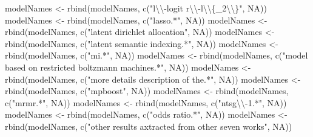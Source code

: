 \documentclass[
]{article}
\newenvironment{Shaded}{\begin{snugshade}}{\end{snugshade}}
\newcommand{\ConstantTok}[1]{\textcolor[rgb]{0.00,0.00,0.00}{#1}}
\newcommand{\FunctionTok}[1]{\textcolor[rgb]{0.00,0.00,0.00}{#1}}
\newcommand{\NormalTok}[1]{#1}
\newcommand{\OtherTok}[1]{\textcolor[rgb]{0.56,0.35,0.01}{#1}}
\newcommand{\SpecialCharTok}[1]{\textcolor[rgb]{0.00,0.00,0.00}{#1}}
\newcommand{\StringTok}[1]{\textcolor[rgb]{0.31,0.60,0.02}{#1}}
\begin{document}
\begin{Shaded}
\begin{Highlighting}[]
\NormalTok{modelNames }\OtherTok{\textless{}{-}} \FunctionTok{rbind}\NormalTok{(modelNames, }\FunctionTok{c}\NormalTok{(}\StringTok{"l}\SpecialCharTok{\textbackslash{}\textbackslash{}}\StringTok{{-}logit r}\SpecialCharTok{\textbackslash{}\textbackslash{}}\StringTok{{-}l}\SpecialCharTok{\textbackslash{}\textbackslash{}}\StringTok{\{\_2}\SpecialCharTok{\textbackslash{}\textbackslash{}}\StringTok{\}"}\NormalTok{, }\ConstantTok{NA}\NormalTok{))}
\NormalTok{modelNames }\OtherTok{\textless{}{-}} \FunctionTok{rbind}\NormalTok{(modelNames, }\FunctionTok{c}\NormalTok{(}\StringTok{"lasso.*"}\NormalTok{, }\ConstantTok{NA}\NormalTok{))}
\NormalTok{modelNames }\OtherTok{\textless{}{-}} \FunctionTok{rbind}\NormalTok{(modelNames, }\FunctionTok{c}\NormalTok{(}\StringTok{"latent dirichlet allocation"}\NormalTok{, }\ConstantTok{NA}\NormalTok{))}
\NormalTok{modelNames }\OtherTok{\textless{}{-}} \FunctionTok{rbind}\NormalTok{(modelNames, }\FunctionTok{c}\NormalTok{(}\StringTok{"latent semantic indexing.*"}\NormalTok{, }\ConstantTok{NA}\NormalTok{))}
\NormalTok{modelNames }\OtherTok{\textless{}{-}} \FunctionTok{rbind}\NormalTok{(modelNames, }\FunctionTok{c}\NormalTok{(}\StringTok{"mi.*"}\NormalTok{, }\ConstantTok{NA}\NormalTok{))}
\NormalTok{modelNames }\OtherTok{\textless{}{-}} \FunctionTok{rbind}\NormalTok{(modelNames, }\FunctionTok{c}\NormalTok{(}\StringTok{"model based on restricted boltzmann machines.*"}\NormalTok{, }\ConstantTok{NA}\NormalTok{))}
\NormalTok{modelNames }\OtherTok{\textless{}{-}} \FunctionTok{rbind}\NormalTok{(modelNames, }\FunctionTok{c}\NormalTok{(}\StringTok{"more details description of the.*"}\NormalTok{, }\ConstantTok{NA}\NormalTok{))}
\NormalTok{modelNames }\OtherTok{\textless{}{-}} \FunctionTok{rbind}\NormalTok{(modelNames, }\FunctionTok{c}\NormalTok{(}\StringTok{"mpboost"}\NormalTok{, }\ConstantTok{NA}\NormalTok{))}
\NormalTok{modelNames }\OtherTok{\textless{}{-}} \FunctionTok{rbind}\NormalTok{(modelNames, }\FunctionTok{c}\NormalTok{(}\StringTok{"mrmr.*"}\NormalTok{, }\ConstantTok{NA}\NormalTok{))}
\NormalTok{modelNames }\OtherTok{\textless{}{-}} \FunctionTok{rbind}\NormalTok{(modelNames, }\FunctionTok{c}\NormalTok{(}\StringTok{"ntsg}\SpecialCharTok{\textbackslash{}\textbackslash{}}\StringTok{{-}1.*"}\NormalTok{, }\ConstantTok{NA}\NormalTok{))}
\NormalTok{modelNames }\OtherTok{\textless{}{-}} \FunctionTok{rbind}\NormalTok{(modelNames, }\FunctionTok{c}\NormalTok{(}\StringTok{"odds ratio.*"}\NormalTok{, }\ConstantTok{NA}\NormalTok{))}
\NormalTok{modelNames }\OtherTok{\textless{}{-}} \FunctionTok{rbind}\NormalTok{(modelNames, }\FunctionTok{c}\NormalTok{(}\StringTok{"other results axtracted from other seven works"}\NormalTok{, }\ConstantTok{NA}\NormalTok{))}

\end{Highlighting}
\end{Shaded}
\end{document}
